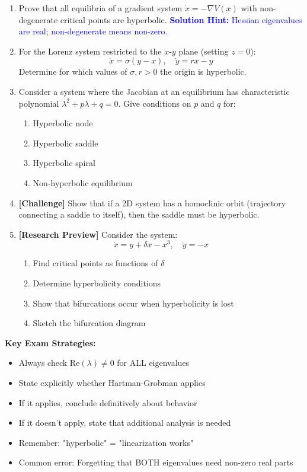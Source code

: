 \documentclass[12pt]{article}
\newcommand{\solution}[1]{\textcolor{blue}{\textbf{Solution Hint:} #1}}
\begin{document}
\begin{enumerate}[resume]
\item Prove that all equilibria of a gradient system $\dot{x} = -\nabla V(x)$ with non-degenerate critical points are hyperbolic.
\solution{Hessian eigenvalues are real; non-degenerate means non-zero.}

\item For the Lorenz system restricted to the $x$-$y$ plane (setting $z = 0$):
$$\dot{x} = \sigma(y - x), \quad \dot{y} = rx - y$$
Determine for which values of $\sigma, r > 0$ the origin is hyperbolic.

\item Consider a system where the Jacobian at an equilibrium has characteristic polynomial $\lambda^2 + p\lambda + q = 0$. Give conditions on $p$ and $q$ for:
\begin{enumerate}[label=(\alph*)]
    \item Hyperbolic node
    \item Hyperbolic saddle
    \item Hyperbolic spiral
    \item Non-hyperbolic equilibrium
\end{enumerate}

\item \textbf{[Challenge]} Show that if a 2D system has a homoclinic orbit (trajectory connecting a saddle to itself), then the saddle must be hyperbolic.

\item \textbf{[Research Preview]} Consider the system:
$$\dot{x} = y + \delta x - x^3, \quad \dot{y} = -x$$
\begin{enumerate}[label=(\alph*)]
    \item Find critical points as functions of $\delta$
    \item Determine hyperbolicity conditions
    \item Show that bifurcations occur when hyperbolicity is lost
    \item Sketch the bifurcation diagram
\end{enumerate}
\end{enumerate}

\begin{hint}
\textbf{Key Exam Strategies:}
\begin{itemize}
    \item Always check $\text{Re}(\lambda) \neq 0$ for ALL eigenvalues
    \item State explicitly whether Hartman-Grobman applies
    \item If it applies, conclude definitively about behavior
    \item If it doesn't apply, state that additional analysis is needed
    \item Remember: "hyperbolic" = "linearization works"
    \item Common error: Forgetting that BOTH eigenvalues need non-zero real parts
\end{itemize}
\end{hint}
\end{document}
